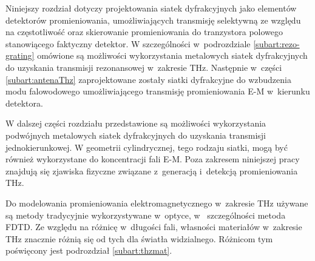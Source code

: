 Niniejszy rozdział dotyczy projektowania siatek dyfrakcyjnych jako elementów detektorów promieniowania, umożliwiających transmisję selektywną ze względu na częstotliwość oraz skierowanie promieniowania do tranzystora polowego stanowiącego faktyczny detektor. W szczególności w~podrozdziale \ref{subart:rezo-grating} omówione są możliwości wykorzystania metalowych siatek dyfrakcyjnych do uzyskania transmisji rezonansowej w~zakresie THz. Następnie w~części \ref{subart:antenaThz} zaprojektowane zostały siatki dyfrakcyjne do wzbudzenia modu falowodowego umożliwiającego transmisję promieniowania E-M w~kierunku detektora.

W dalszej części rozdziału przedstawione są możliwości wykorzystania podwójnych metalowych siatek dyfrakcyjnych do uzyskania transmisji jednokierunkowej. W geometrii cylindrycznej, tego rodzaju siatki, mogą być również wykorzystane do koncentracji fali E-M. Poza zakresem niniejszej pracy znajdują się zjawiska fizyczne związane z~generacją i~detekcją promieniowania THz.

Do modelowania promieniowania elektromagnetycznego w~zakresie THz używane są metody tradycyjnie wykorzystywane w~optyce, w~ szczególności metoda FDTD. Ze względu na różnicę w~długości fali, własności materiałów w~zakresie THz znacznie różnią się od tych dla światła widzialnego. Różnicom tym poświęcony jest podrozdział \ref{subart:thzmat}.
